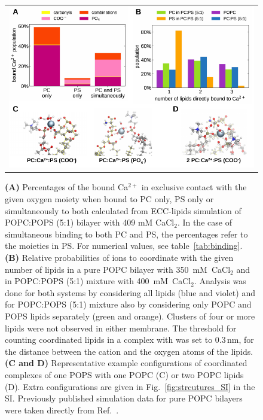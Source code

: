 \documentclass[journal=jctcce,manuscript=article]{achemso}
\newlength{\figwidth}
\newlength{\figwidthfull}
\begin{document}
\begin{figure}[tbp!] 
  \centering 
  \begin{tabular}{ c }
  \includegraphics[width=\figwidthfull]{../img/populations_stoichiometry_structures.pdf} 
  \end{tabular}
  \caption{ \label{fig:cacl_complexes} 
    \textbf{(A)} Percentages of the bound Ca$^{2+}$ 
    in exclusive contact with the given oxygen moiety
    when bound to PC only, PS only or simultaneously to both
    calculated from ECC-lipids simulation of POPC:POPS (5:1) bilayer with 409 mM CaCl$_2$. 
	In the case of simultaneous binding to both PC and PS,
	the percentages refer to the moieties in PS.
        For numerical values, see table~\ref{tab:binding}.
    \textbf{(B)} Relative probabilities of  ions to coordinate with the given number of lipids
    in a pure POPC bilayer with 350~mM~CaCl$_2$ and in POPC:POPS (5:1) mixture with 400~mM~CaCl$_2$.  
    Analysis was done for both systems by considering all lipids (blue and violet) and
    for POPC:POPS (5:1) mixture also by considering only POPC and POPS lipids separately (green and orange). 
    Clusters of four or more lipids were not observed in either membrane.
    The threshold for counting coordinated lipids in a complex with  was set to $0.3\,\mathrm{nm}$, 
    for the distance between the cation and the oxygen atoms of the lipids. 
    \textbf{(C and D)} Representative example configurations of  coordinated complexes 
    of one POPS with one POPC (C) or two POPC lipids (D). 
    Extra configurations are given in Fig.~\ref{fig:strcutures_SI} in the SI. 
    Previously published simulation data \cite{melcr18} for pure POPC bilayers were taken directly from Ref.~. 
  }
\end{figure} 
\end{document}
